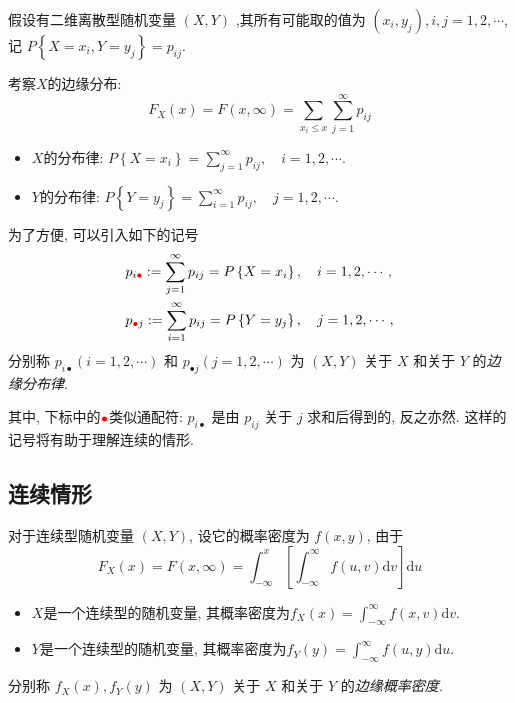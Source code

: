 假设有二维离散型随机变量 $(X, Y)$ ,其所有可能取的值为 $\left(x_i, y_j\right), i, j=1,2, \cdots$, 记 $P\left\{X=x_i, Y=y_j\right\}=p_{i j}$. 
\begin{definition*}
  考察$X$的边缘分布:
  $$
        F_X(x)=F(x, \infty)=\sum_{x_i \leqslant x} \sum_{j=1}^{\infty} p_{i j}
    $$

    \begin{itemize}
        \item $X$的分布律: $P\left\{X=x_i\right\}=\sum_{j=1}^{\infty} p_{i j}, \quad i=1,2, \cdots .$
        \item $Y$的分布律: $P\left\{Y=y_j\right\}=\sum_{i=1}^{\infty} p_{i j}, \quad j=1,2, \cdots .$
    \end{itemize}

    为了方便, 可以引入如下的记号
    $$
        \begin{aligned}
             & p_{i {{\color{red}\bullet}}}:=\sum_{j=1}^{\infty} p_{i j}=P\left\{X=x_i\right\}, \quad i=1,2, \cdots,   \\
             & p_{{{{\color{red}\bullet}}} j}:=\sum_{i=1}^{\infty} p_{i j}=P\left\{Y=y_j\right\}, \quad j=1,2, \cdots,
        \end{aligned}
    $$
    分别称 $p_{i \bullet} (i=1,2, \cdots)$ 和 $p_{\bullet j}(j=1,2, \cdots)$ 为 $(X, Y)$ 关于 $X$ 和关于 $Y$ 的\emph{边缘分布律}.
\end{definition*}
    
    其中, 下标中的${{\color{red}\bullet}}$类似通配符: $p_{i\bullet}$ 是由 $p_{i j}$ 关于 $j$ 求和后得到的, 反之亦然. 这样的记号将有助于理解连续的情形.

    \subsection{连续情形}

    \begin{definition*}
      对于连续型随机变量 $(X, Y)$, 设它的概率密度为 $f(x, y)$, 由于
        $$
            F_X(x)=F(x, \infty)=\int_{-\infty}^x\left[\int_{-\infty}^{\infty} f(u, v) \mathrm{d} v\right] \mathrm{d} u
        $$

        \begin{itemize}
            \item $X$是一个连续型的随机变量, 其概率密度为$f_X(x)=\int_{-\infty}^{\infty} f(x, v) \mathrm{d} v$.
            \item $Y$是一个连续型的随机变量, 其概率密度为$f_Y(y)=\int_{-\infty}^{\infty} f(u, y) \mathrm{d} u$.
        \end{itemize}

        分别称 $f_X(x), f_Y(y)$ 为 $(X, Y)$ 关于 $X$ 和关于 $Y$ 的\emph{边缘概率密度.}
    \end{definition*}


